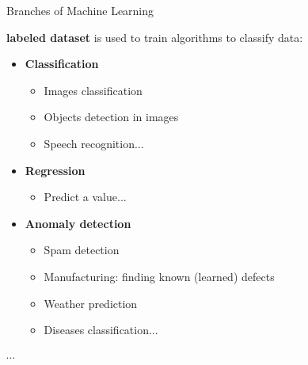\documentclass[10pt,serif,mathserif,compress,hyperref={colorlinks}]{beamer}
\begin{document}
\begin{frame}{Branches of Machine Learning}


  \begin{tcolorbox}[title=Supervised learning applications]
    {\bf labeled dataset} is used to train algorithms to classify data:
    \begin{itemize}
    \item \textbf{Classification}
      \begin{itemize}
      \item Images classification
      \item Objects detection in images
      \item Speech recognition...
      \end{itemize}
    \item \textbf{Regression}
      \begin{itemize}
      \item Predict a value...
      \end{itemize}
    \item \textbf{Anomaly detection}
      \begin{itemize}
      \item Spam detection
      \item Manufacturing: finding known (learned) defects
      \item Weather prediction
      \item Diseases classification...
      \end{itemize}        
    \end{itemize}
    \vspace*{-1mm}$\cdots$
  \end{tcolorbox}
  
\end{frame}
\end{document}
